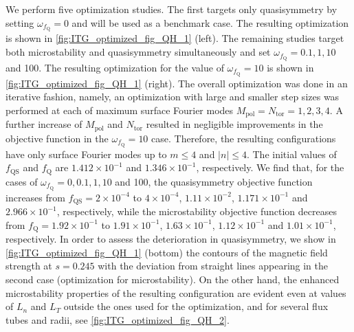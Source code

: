 \documentclass[prl,twocolumn,amsmath,amssymb,showpacs,superscriptaddress]{revtex4-2}
\begin{document}
We perform {five} optimization studies.
%
The first targets only quasisymmetry by setting $\omega_{f_{\text{Q}}}=0$ and will be used as a benchmark case.
%
The resulting optimization is shown in \cref{fig:ITG_optimized_fig_QH_1} (left).
%
The {remaining studies} target both microstability and quasisymmetry simultaneously and set {$\omega_{f_{\text{Q}}}=0.1, 1, 10$ and 100}.
%
The resulting optimization {for the value of $\omega_{f_{\text{Q}}}=10$} is shown in \cref{fig:ITG_optimized_fig_QH_1} (right).
%
The overall optimization was done in an iterative fashion, namely, an optimization with large and smaller step sizes was performed at each of maximum surface Fourier modes $M_{\mathrm{pol}}=N_{\mathrm{tor}}=1, 2, 3, 4$.
%
A further increase of $M_{\mathrm{pol}}$ and $N_{\mathrm{tor}}$ resulted in negligible improvements in the objective function in the $\omega_{f_{\text{Q}}}=10$ case.
%
Therefore, the resulting configurations have only surface Fourier modes up to $m\le4$ and $|n|\le4$.
%
{The initial values of $f_{\text{QS}}$ and $f_{\text{Q}}$ are $1.412\times10^{-1}$ and $1.346\times10^{-1}$, respectively.}
%
{
We find that, for the cases of $\omega_{f_{\text{Q}}}=0, 0.1, 1, 10$ and 100, the quasisymmetry objective function increases from $f_{\text{QS}}=2\times10^{-4}$ to $4\times10^{-4}$, $1.11\times10^{-2}$, $1.171\times10^{-1}$ and $2.966\times10^{-1}$, respectively, while the microstability objective function decreases from $f_{\text{Q}}=1.92\times10^{-1}$ to $1.91\times10^{-1}$, $1.63\times10^{-1}$, $1.12\times10^{-1}$ and $1.01\times10^{-1}$, respectively.
}
%
In order to assess the deterioration in quasisymmetry, we show in \cref{fig:ITG_optimized_fig_QH_1} {(bottom)} the contours of the magnetic field strength at $s=0.245$ with the deviation from straight lines appearing in the second case (optimization for microstability).
%
On the other hand, the enhanced microstability properties of the resulting configuration {are} evident even at values of $L_n$ and $L_T$ outside the ones used for the optimization, {and for several flux tubes and radii,} see {\cref{fig:ITG_optimized_fig_QH_2}}.
\end{document}
